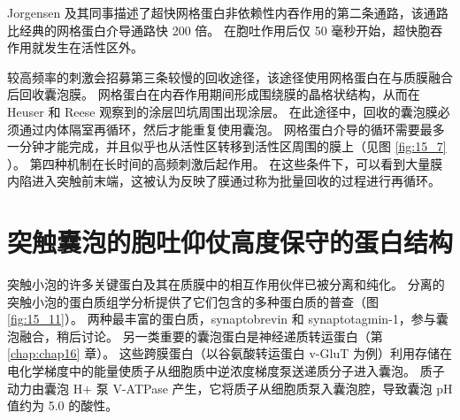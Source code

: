 Jorgensen 及其同事描述了超快网格蛋白非依赖性内吞作用的第二条通路，该通路比经典的网格蛋白介导通路快 200 倍。 
在胞吐作用后仅 50 毫秒开始，超快胞吞作用就发生在活性区外。


较高频率的刺激会招募第三条较慢的回收途径，该途径使用网格蛋白在与质膜融合后回收囊泡膜。 
网格蛋白在内吞作用期间形成围绕膜的晶格状结构，从而在 Heuser 和 Reese 观察到的涂层凹坑周围出现涂层。 
在此途径中，回收的囊泡膜必须通过内体隔室再循环，然后才能重复使用囊泡。 
网格蛋白介导的循环需要最多一分钟才能完成，并且似乎也从活性区转移到活性区周围的膜上（见图 \ref{fig:15_7} ）。 
第四种机制在长时间的高频刺激后起作用。 在这些条件下，可以看到大量膜内陷进入突触前末端，这被认为反映了膜通过称为批量回收的过程进行再循环。


\section{突触囊泡的胞吐仰仗高度保守的蛋白结构}
突触小泡的许多关键蛋白及其在质膜中的相互作用伙伴已被分离和纯化。 
分离的突触小泡的蛋白质组学分析提供了它们包含的多种蛋白质的普查（图 \ref{fig:15_11}）。 
两种最丰富的蛋白质，synaptobrevin 和 synaptotagmin-1，参与囊泡融合，稍后讨论。 
另一类重要的囊泡蛋白是神经递质转运蛋白（第 \ref{chap:chap16} 章）。 
这些跨膜蛋白（以谷氨酸转运蛋白 v-GluT 为例）利用存储在电化学梯度中的能量使质子从细胞质中逆浓度梯度泵送递质分子进入囊泡。 
质子动力由囊泡 H+ 泵 V-ATPase 产生，它将质子从细胞质泵入囊泡腔，导致囊泡 pH 值约为 5.0 的酸性。

